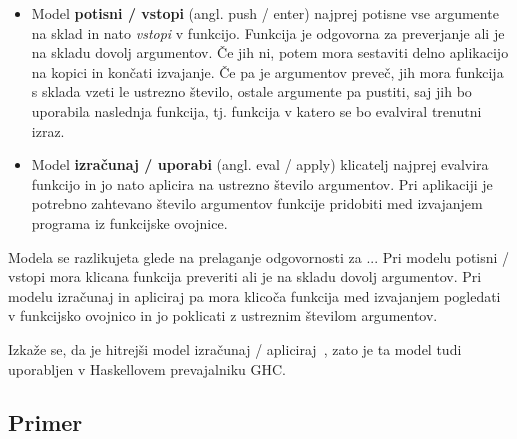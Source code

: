 

%
\begin{itemize}
	\itemsep 0em
	\item Model \textbf{potisni / vstopi} (angl. push / enter) najprej potisne vse argumente na sklad in nato \textit{vstopi} v funkcijo. Funkcija je odgovorna za preverjanje ali je na skladu dovolj argumentov. Če jih ni, potem mora sestaviti delno aplikacijo na kopici in končati izvajanje. Če pa je argumentov preveč, jih mora funkcija s sklada vzeti le ustrezno število, ostale argumente pa pustiti, saj jih bo uporabila naslednja funkcija, tj. funkcija v katero se bo evalviral trenutni izraz.
	\item Model \textbf{izračunaj / uporabi} (angl. eval / apply) klicatelj najprej evalvira funkcijo in jo nato aplicira na ustrezno število argumentov. Pri aplikaciji je potrebno zahtevano število argumentov funkcije pridobiti med izvajanjem programa iz funkcijske ovojnice.
\end{itemize}

Modela se razlikujeta glede na prelaganje odgovornosti za ... Pri modelu potisni / vstopi mora klicana funkcija preveriti ali je na skladu dovolj argumentov. Pri modelu izračunaj in apliciraj pa mora klicoča funkcija med izvajanjem pogledati v funkcijsko ovojnico in jo poklicati z ustreznim številom argumentov.


Izkaže se, da je hitrejši model izračunaj / apliciraj~\cite{marlow2004making}, zato je ta model tudi uporabljen v Haskellovem prevajalniku GHC.


\subsection{Primer}
